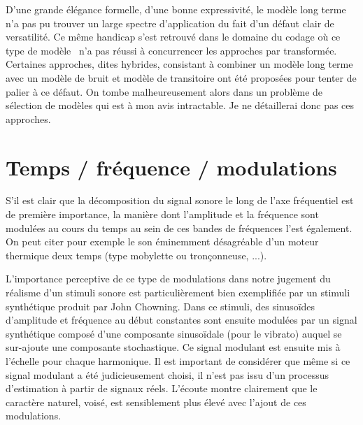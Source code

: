 D'une grande élégance formelle, d'une bonne expressivité, le modèle long terme n'a pas pu trouver un large spectre d'application du fait d'un défaut clair de versatilité. Ce même handicap s'est retrouvé dans le domaine du codage où ce type de modèle~\cite{den2002parametric} n'a pas réussi à concurrencer les approches par transformée. Certaines approches, dites hybrides, consistant à combiner un modèle long terme avec un modèle de bruit et modèle de transitoire ont été proposées pour tenter de palier à ce défaut. On tombe malheureusement alors dans un problème de sélection de modèles qui est à mon avis intractable. Je ne détaillerai donc pas ces approches.


\section{ \nmu Temps / fréquence / modulations}  \label{sec:tfm}

S'il est clair que la décomposition du signal sonore le long de l'axe fréquentiel est de première importance, la manière dont l'amplitude et la fréquence sont modulées au cours du temps au sein de ces bandes de fréquences l'est également. On peut citer pour exemple le son éminemment désagréable d'un moteur thermique deux temps (type mobylette ou tronçonneuse, ...).


L'importance perceptive de ce type de modulations dans notre jugement du réalisme d'un stimuli sonore est particulièrement bien exemplifiée par un stimuli synthétique produit par John Chowning. Dans ce stimuli, des sinusoïdes d'amplitude et fréquence au début constantes sont ensuite modulées par un signal synthétique composé d'une composante sinusoïdale (pour le vibrato) auquel se sur-ajoute une composante stochastique. Ce signal modulant est ensuite mis à l'échelle pour chaque harmonique. Il est important de considérer que même si ce signal modulant a été judicieusement choisi, il n'est pas issu d'un processus d'estimation à partir de signaux réels. L'écoute montre clairement que le caractère naturel, voisé, est sensiblement plus élevé avec l'ajout de ces modulations.

